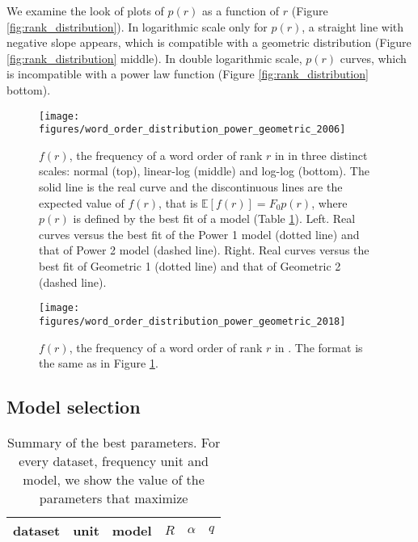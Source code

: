 \documentclass[USenglish]{article}
\newcommand{\loglikelihood}{{\cal L}}
\begin{document}
We examine the look of plots of $p(r)$ as a function of $r$ (Figure \ref{fig:rank_distribution}).
In logarithmic scale only for $p(r)$, a straight line with negative slope appears, which is compatible with a geometric distribution (Figure \ref{fig:rank_distribution} middle). 
In double logarithmic scale, $p(r)$ curves, which is incompatible with a power law function (Figure \ref{fig:rank_distribution} bottom). 

\begin{figure}[h]
\texttt{[image: figures/word\_order\_distribution\_power\_geometric\_2006]}
\caption{\label{fig:rank_distribution_power_geometric_2006}
$f(r)$, the frequency of a word order of rank $r$ in \citet{Dryer2006a} in three distinct scales: normal (top), linear-log (middle) and log-log (bottom). The solid line is the real curve and the discontinuous lines are the expected value of $f(r)$, that is $\mathbb{E}[f(r)] = F_0 p(r)$, where $p(r)$ is defined by the best fit of a model (Table \ref{tbl:best_parameters_summary}). Left. Real curves versus the best fit of the Power 1 model (dotted line) and that of Power 2 model (dashed line). Right. Real curves versus the best fit of Geometric 1 (dotted line) and that of Geometric 2 (dashed line). }
\end{figure}

\begin{figure}[h]
\texttt{[image: figures/word\_order\_distribution\_power\_geometric\_2018]}
\caption{\label{fig:rank_distribution_power_geometric_2018}
$f(r)$, the frequency of a word order of rank $r$ in \citet{Dryer2018a}. The format is the same as in Figure \ref{fig:rank_distribution_power_geometric_2006}. }
\end{figure}

\subsection{Model selection}

\label{sec:model_selection_results}

\begin{table}[h]
\begin{center}
\begin{tabular}{llllll}
dataset & unit & model & $R$ & $\alpha$ & $q$ \\
\toprule
 
\end{tabular}
\end{center}
\caption{\label{tbl:best_parameters_summary}
Summary of the best parameters. For every dataset, frequency unit and model, we show the value of the parameters that maximize 
\iftoggle{squib}{$\loglikelihood$. }{$\loglikelihood$ ($R$ is the number of non-zero probability ranks, $\alpha$ is the exponent of the power-law models and $q$ is a parameter of the geometric models).} 
}
\end{table}
\end{document}
